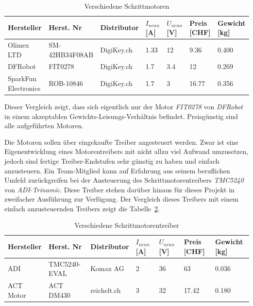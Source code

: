 \documentclass[main.tex]{subfiles} %
\begin{document}
\begin{table}[h]
    \centering
    \begin{tabular}{|p{2cm}|p{3cm}|p{2cm}|p{1cm}|p{1cm}|p{1cm}|p{1.5cm}|}
        \hline
        Hersteller           & Herst. Nr      & Distributor & $I_{nenn} $ [A] & $U_{nenn}$ [V] & Preis [CHF] & Gewicht [kg] \\ \hline
        Olimex LTD           & SM-42HB34F08AB & DigiKey.ch  & 1.33            & 12             & 9.36        & 0.400        \\ \hline
        DFRobot              & FIT0278        & DigiKey.ch  & 1.7             & 3.4            & 12          & 0.269        \\ \hline
        SparkFun Electronics & ROB-10846      & DigiKey.ch  & 1.7             & 3              & 16.77       & 0.356        \\ \hline
    \end{tabular}
    \caption{Verschiedene Schrittmotoren}
    \label{tab:Schrittmotoren_different}
\end{table}

Dieser Vergleich zeigt, dass sich eigentlich nur der Motor \textit{FIT0278} von
\textit{DFRobot} in einem akzeptablen Gewichts-Leisungs-Verhältnis befindet.
Preisgünstig sind alle aufgeführten Motoren.

Die Motoren sollen über eingekaufte Treiber angesteuert werden. Zwar ist eine
Eigenentwicklung eines Motorentreibers mit nicht allzu viel Aufwand umzusetzen,
jedoch sind fertige Treiber-Endstufen sehr günstig zu haben und einfach
anzusteuern. Ein Team-Mitglied kann auf Erfahrung aus seinem beruflichen Umfeld
zurückgreifen bei der Ansteuerung des Schrittmotorentreibers \textit{TMC5240}
von \textit{ADI-Trinamic}. Diese Treiber stehen darüber hinaus für dieses
Projekt in zweifacher Ausführung zur Verfügung. Der Vergleich dieses Treibers
mit einem einfach anzusteuernden Treibers zeigt die
Tabelle~\ref{tab:Schrittmotorentreiber_different}.

\begin{table}[h]
    \centering
    \begin{tabular}{|p{2cm}|p{3cm}|p{2cm}|p{1cm}|p{1cm}|p{1cm}|p{1.5cm}|}
        \hline
        Hersteller & Herst. Nr    & Distributor & $I_{nenn} $ [A] & $U_{nenn}$ [V] & Preis [CHF] & Gewicht [kg] \\ \hline
        ADI        & TMC5240-EVAL & Komax AG    & 2               & 36             & 63          & 0.036        \\ \hline
        ACT Motor  & ACT DM430    & reichelt.ch & 3               & 32             & 17.42       & 0.180        \\ \hline
    \end{tabular}
    \caption{Verschiedene Schrittmotorentreiber}
    \label{tab:Schrittmotorentreiber_different}
\end{table}
\end{document}
